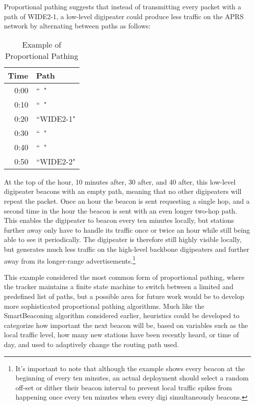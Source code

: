Proportional pathing suggests that instead of transmitting every packet with
a path of WIDE2-1, a low-level digipeater could produce less traffic on the
APRS network by alternating between paths as follows:
\begin{table}[!h]
	\centering
	\begin{tabular}{ | r | l |}
		\hline
		Time & Path \\ \hline
		0:00 & ``~" \\ \hline
		0:10 & ``~" \\ \hline
		0:20 & ``WIDE2-1" \\ \hline
		0:30 & ``~" \\ \hline
		0:40 & ``~" \\ \hline
		0:50 & ``WIDE2-2" \\ \hline
	\end{tabular}
	\caption{Example of Proportional Pathing}
	\label{tab:exproppath}
\end{table}

At the top of the hour, 10 minutes after, 30 after, and 40 after, 
this low-level digipeater
beacons with an empty path, meaning that no other digipeaters will repeat the
packet.
Once an hour the beacon is sent requesting a single hop, and a second time
in the hour the beacon is sent with an even longer two-hop path.
This enables the digipeater to beacon every ten minutes locally,
but stations further away only have to handle its traffic once or twice an hour
while still being able to see it periodically.
The digipeater is therefore still highly visible locally, but generates
much less traffic on the high-level backbone digipeaters and further away from its
longer-range advertisements.\footnote{It's important
	to note that although the example shows every beacon at the beginning of
	every ten minutes, an actual deployment should select a random off-set
or dither their beacon interval to prevent local traffic spikes 
from happening once every ten minutes when every digi simultaneously beacons.}

This example considered the most common form of proportional pathing,
where the tracker maintains a finite state machine to switch between
a limited and predefined list of paths,
but a possible area for future work would be to develop more sophisticated
proportional pathing algorithms.
Much like the SmartBeaconing algorithm considered earlier,
heuristics could be developed to categorize how important the next beacon
will be, based on variables such as the local traffic level,
how many new stations have been recently heard, or time of day,
and used to adaptively change the routing path used.

